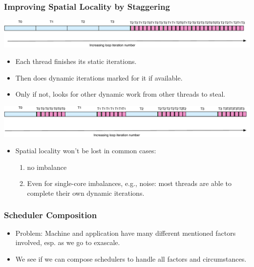 {%
\begin{frame}[label=sdsSched]
\frametitle{Improving Spatial Locality by Staggering}
\begin{center}
\includegraphics[scale=0.28]{./images/sdIncrIters}
\end{center}
\begin{itemize}
\small \item \small Each thread finishes its static iterations.
\item \small Then does dynamic iterations marked for it if available.
\item \small Only if not, looks for other dynamic work from other threads to steal.
\end{itemize}
\begin{center}
\includegraphics[scale=0.28]{./images/sdsIncrIters}
\end{center}
\begin{itemize}
\item \small Spatial locality won't be lost in common cases:
\begin{enumerate}
\tiny \item \tiny no imbalance
\item \tiny Even for single-core imbalances, e.g., noise: most
 threads are able to complete their own dynamic iterations.
\end{enumerate}
\end{itemize}
\end{frame}

\begin{frame}[label=schedComp]
\frametitle{Scheduler Composition}
\begin{itemize}
\small \item \small Problem: Machine and application have many
different mentioned factors involved, esp. as we go to exascale.
\item \small We see if we can compose schedulers to handle all factors and circumstances.
\end{itemize}
\end{frame}

}

